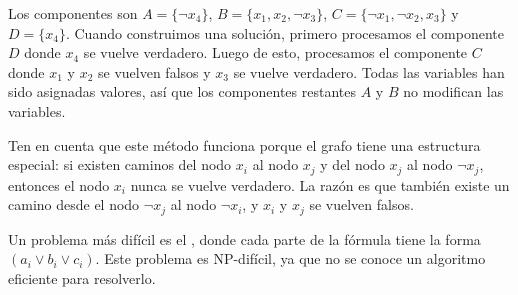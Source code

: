 Los componentes son
$A = \{\lnot x_4\}$,
$B = \{x_1, x_2, \lnot x_3\}$,
$C = \{\lnot x_1, \lnot x_2, x_3\}$ y
$D = \{x_4\}$. Cuando construimos una solución, primero procesamos el
componente $D$ donde $x_4$ se vuelve verdadero. Luego de esto,
procesamos el componente $C$ donde $x_1$ y $x_2$ se vuelven falsos y
$x_3$ se vuelve verdadero. Todas las variables han sido asignadas
valores, así que los componentes restantes $A$ y $B$ no modifican
las variables.

Ten en cuenta que este método funciona porque el grafo tiene una
estructura especial: si existen caminos del nodo $x_i$ al nodo $x_j$
y del nodo $x_j$ al nodo $\lnot x_j$, entonces el nodo $x_i$ nunca se
vuelve verdadero. La razón es que también existe un camino
desde el nodo $\lnot x_j$ al nodo $\lnot x_i$, y $x_i$ y $x_j$ se
vuelven falsos.


Un problema más difícil es el , donde cada parte
de la fórmula tiene la forma $(a_i \lor b_i \lor c_i)$. Este problema es
NP-difícil, ya que no se conoce un algoritmo eficiente para resolverlo.
